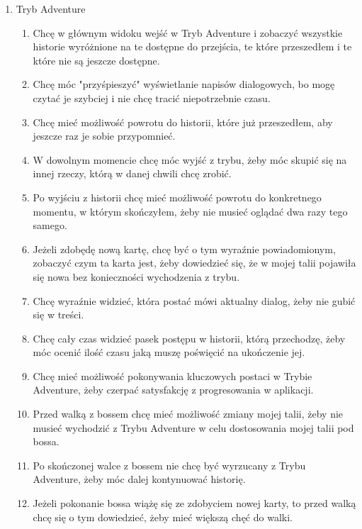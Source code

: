 \documentclass{article}
\begin{document}
\begin{tcolorbox}
\begin{enumerate}
\begin{enumerate}
\begin{enumerate}
                        \end{enumerate}
                  \item Tryb Adventure
                        \begin{enumerate}
                            \item Chcę w głównym widoku wejść w Tryb Adventure i zobaczyć wszystkie historie wyróżnione na te dostępne do przejścia, te które przeszedłem i te które nie są jeszcze dostępne.
                            \item Chcę móc "przyśpieszyć" wyświetlanie napisów dialogowych, bo mogę czytać je szybciej i nie chcę tracić niepotrzebnie czasu.
                            \item Chcę mieć możliwość powrotu do historii, które już przeszedłem, aby jeszcze raz je sobie przypomnieć.
                            \item W dowolnym momencie chcę móc wyjść z trybu, żeby móc skupić się na innej rzeczy, którą w danej chwili chcę zrobić.
                            \item Po wyjściu z historii chcę mieć możliwość powrotu do konkretnego momentu, w którym skończyłem, żeby nie musieć oglądać dwa razy tego samego.
                            \item Jeżeli zdobędę nową kartę, chcę być o tym wyraźnie powiadomionym, zobaczyć czym ta karta jest, żeby dowiedzieć się, że w mojej talii pojawiła się nowa bez konieczności wychodzenia z trybu.
                            \item Chcę wyraźnie widzieć, która postać mówi aktualny dialog, żeby nie gubić się w treści.
                            \item Chcę cały czas widzieć pasek postępu w historii, którą przechodzę, żeby móc ocenić ilość czasu jaką muszę poświęcić na ukończenie jej.
                            \item Chcę mieć możliwość pokonywania kluczowych postaci w Trybie Adventure, żeby czerpać satysfakcję z progresowania w aplikacji.
                            \item Przed walką z bossem chcę mieć możliwość zmiany mojej talii, żeby nie musieć wychodzić z Trybu Adventure w celu dostosowania mojej talii pod bossa.
                            \item Po skończonej walce z bossem nie chcę być wyrzucany z Trybu Adventure, żeby móc dalej kontynuować historię.
                            \item Jeżeli pokonanie bossa wiążę się ze zdobyciem nowej karty, to przed walką chcę się o tym dowiedzieć, żeby mieć większą chęć do walki.

\end{enumerate}
\end{enumerate}
\end{enumerate}
\end{tcolorbox}
\end{document}
